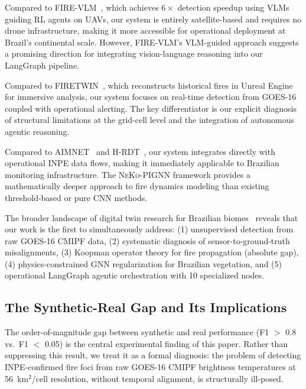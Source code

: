 \documentclass[5p,twocolumn]{elsarticle}
\newcommand{\abbrev}[1]{{\small\textsc{#1}}}
\begin{document}
Compared to \abbrev{FIRE-VLM}~\cite{webb2026}, which achieves $6\times$ detection speedup using \abbrev{VLM}s guiding \abbrev{RL} agents on \abbrev{UAV}s, our system is entirely satellite-based and requires no drone infrastructure, making it more accessible for operational deployment at Brazil's continental scale. However, \abbrev{FIRE-VLM}'s \abbrev{VLM}-guided approach suggests a promising direction for integrating vision-language reasoning into our LangGraph pipeline.

Compared to \abbrev{FIRETWIN}~\cite{raha2025}, which reconstructs historical fires in Unreal Engine for immersive analysis, our system focuses on real-time detection from \abbrev{GOES-16} coupled with operational alerting. The key differentiator is our explicit diagnosis of structural limitations at the grid-cell level and the integration of autonomous agentic reasoning.

Compared to \abbrev{AIMNET}~\cite{zhou2025} and \abbrev{H-RDT}~\cite{shen2025}, our system integrates directly with operational \abbrev{INPE} data flows, making it immediately applicable to Brazilian monitoring infrastructure. The \abbrev{NeKo-PIGNN} framework provides a mathematically deeper approach to fire dynamics modeling than existing threshold-based or pure \abbrev{CNN} methods.

The broader landscape of digital twin research for Brazilian biomes~\cite{prapas2023,lee2026,mukkavilli2023} reveals that our work is the first to simultaneously address: (1) unsupervised detection from raw \abbrev{GOES-16} \abbrev{CMIPF} data, (2) systematic diagnosis of sensor-to-ground-truth misalignments, (3) Koopman operator theory for fire propagation (absolute gap), (4) physics-constrained \abbrev{GNN} regularization for Brazilian vegetation, and (5) operational LangGraph agentic orchestration with 10 specialized nodes.

\subsection{The Synthetic-Real Gap and Its Implications}

The order-of-magnitude gap between synthetic and real performance (F1 $>$ 0.8 vs.\ F1 $<$ 0.05) is the central experimental finding of this paper. Rather than suppressing this result, we treat it as a formal diagnosis: the problem of detecting INPE-confirmed fire foci from raw \abbrev{GOES-16} \abbrev{CMIPF} brightness temperatures at 56~km$^2$/cell resolution, without temporal alignment, is structurally ill-posed.
\end{document}
